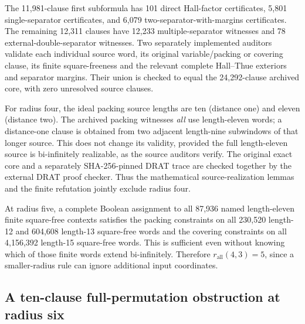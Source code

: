 \documentclass[11pt]{article}
\theoremstyle{remark}
\begin{document}
The 11,981-clause first subformula has 101
direct Hall-factor certificates, 5,801
single-separator certificates, and 6,079
two-separator-with-margins certificates.
The remaining 12,311 clauses have 12,233
multiple-separator witnesses and 78
external-double-separator witnesses.
Two separately implemented auditors validate each
individual source word, its original variable/packing
or covering clause, its finite square-freeness and
the relevant complete Hall--Thue exteriors and
separator margins. Their union is checked to equal
the 24,292-clause archived core, with zero
unresolved source clauses.

For radius four, the ideal packing source lengths
are ten (distance one) and eleven (distance two).
The archived packing witnesses \emph{all} use
length-eleven words; a distance-one clause is
obtained from two adjacent length-nine subwindows
of that longer source. This does not change its
validity, provided the full length-eleven source
is bi-infinitely realizable, as the source auditors
verify. The original exact core and a separately
SHA-256-pinned DRAT trace are checked together
by the external DRAT proof checker. Thus the
mathematical source-realization lemmas and
the finite refutation jointly exclude radius four.

At radius five, a complete Boolean assignment
to all 87,936 named length-eleven finite
square-free contexts satisfies the packing
constraints on all 230,520 length-12 and
604,608 length-13 square-free words and
the covering constraints on all 4,156,392
length-15 square-free words. This is sufficient
even without knowing which of those finite
words extend bi-infinitely. Therefore
$r_{\mathrm{all}}(4,3)=5$, since a
smaller-radius rule can ignore additional
input coordinates.

\subsection{A ten-clause full-permutation obstruction at radius six}
\end{document}
